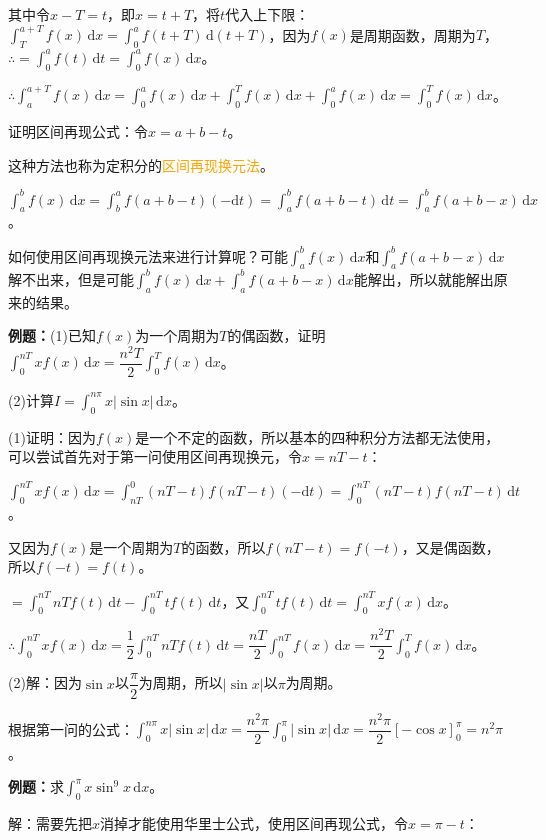 \documentclass[UTF8, 12pt]{ctexart}
\begin{document}
其中令$x-T=t$，即$x=t+T$，将$t$代入上下限：$\int_T^{a+T}f(x)\,\textrm{d}x=\int_0^af(t+T)\,\textrm{d}(t+T)$，因为$f(x)$是周期函数，周期为$T$，$\therefore=\int_0^af(t)\,\textrm{d}t=\int_0^af(x)\,\textrm{d}x$。

$\therefore\int_a^{a+T}f(x)\,\textrm{d}x=\int_0^af(x)\,\textrm{d}x+\int_0^Tf(x)\,\textrm{d}x+\int_0^af(x)\,\textrm{d}x=\int_0^Tf(x)\,\textrm{d}x$。

证明区间再现公式：令$x=a+b-t$。

这种方法也称为定积分的\textcolor{orange}{区间再现换元法}。

$\int_a^bf(x)\,\textrm{d}x=\int_b^af(a+b-t)(-\textrm{d}t)=\int_a^bf(a+b-t)\,\textrm{d}t=\int_a^bf(a+b-x)\,\textrm{d}x$。

如何使用区间再现换元法来进行计算呢？可能$\int_a^bf(x)\,\textrm{d}x$和$\int_a^bf(a+b-x)\,\textrm{d}x$解不出来，但是可能$\int_a^bf(x)\,\textrm{d}x+\int_a^bf(a+b-x)\,\textrm{d}x$能解出，所以就能解出原来的结果。

\textbf{例题：}(1)已知$f(x)$为一个周期为$T$的偶函数，证明$\int_0^{nT}xf(x)\,\textrm{d}x=\dfrac{n^2T}{2}\int_0^Tf(x)\,\textrm{d}x$。

(2)计算$I=\int_0^{n\pi}x\vert\sin x\vert\,\textrm{d}x$。

(1)证明：因为$f(x)$是一个不定的函数，所以基本的四种积分方法都无法使用，可以尝试首先对于第一问使用区间再现换元，令$x=nT-t$：

$\int_0^{nT}xf(x)\,\textrm{d}x=\int_{nT}^0(nT-t)f(nT-t)(-\textrm{d}t)=\int_0^{nT}(nT-t)f(nT-t)\,\textrm{d}t$。

又因为$f(x)$是一个周期为$T$的函数，所以$f(nT-t)=f(-t)$，又是偶函数，所以$f(-t)=f(t)$。

$=\int_0^{nT}nTf(t)\,\textrm{d}t-\int_0^{nT}tf(t)\,\textrm{d}t$，又$\int_0^{nT}tf(t)\,\textrm{d}t=\int_0^{nT}xf(x)\,\textrm{d}x$。

$\therefore\int_0^{nT}xf(x)\,\textrm{d}x=\dfrac{1}{2}\int_0^{nT}nTf(t)\,\textrm{d}t=\dfrac{nT}{2}\int_0^{nT}f(x)\,\textrm{d}x=\dfrac{n^2T}{2}\int_0^Tf(x)\,\textrm{d}x$。

(2)解：因为$\sin x$以$\dfrac{\pi}{2}$为周期，所以$\vert\sin x\vert$以$\pi$为周期。

根据第一问的公式：$\int_0^{n\pi}x\vert\sin x\vert\,\textrm{d}x=\dfrac{n^2\pi}{2}\int_0^\pi\vert\sin x\vert\,\textrm{d}x=\dfrac{n^2\pi}{2}[-\cos x]_0^\pi=n^2\pi$。

\textbf{例题：}求$\int_0^\pi x\sin^9x\,\textrm{d}x$。

解：需要先把$x$消掉才能使用华里士公式，使用区间再现公式，令$x=\pi-t$：
\end{document}
